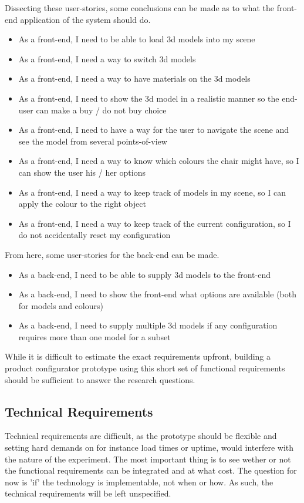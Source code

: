 Dissecting these user-stories, some conclusions can be made as to what the front-end application of the system should do.
\begin{itemize}
	\item As a front-end, I need to be able to load 3d models into my scene
	\item As a front-end, I need a way to switch 3d models
	\item As a front-end, I need a way to have materials on the 3d models
	\item As a front-end, I need to show the 3d model in a realistic manner so the end-user can make a buy / do not buy choice
	\item As a front-end, I need to have a way for the user to navigate the scene and see the model from several points-of-view
	\item As a front-end, I need a way to know which colours the chair might have, so I can show the user his / her options
	\item As a front-end, I need a way to keep track of models in my scene, so I can apply the colour to the right object
	\item As a front-end, I need a way to keep track of the current configuration, so I do not accidentally reset my configuration
\end{itemize}

From here, some user-stories for the back-end can be made.
\begin{itemize}
	\item As a back-end, I need to be able to supply 3d models to the front-end
	\item As a back-end, I need to show the front-end what options are available (both for models and colours)
	\item As a back-end, I need to supply multiple 3d models if any configuration requires more than one model for a subset
\end{itemize}

While it is difficult to estimate the exact requirements upfront, building a product configurator prototype using this short set of functional requirements should be sufficient to answer the research questions. 

\subsection{Technical Requirements}
Technical requirements are difficult, as the prototype should be flexible and setting hard demands on for instance load times or uptime, would interfere with the nature of the experiment. The most important thing is to see wether or not the functional requirements can be integrated and at what cost. The question for now is 'if' the technology is implementable, not when or how. As such, the technical requirements will be left unspecified.

